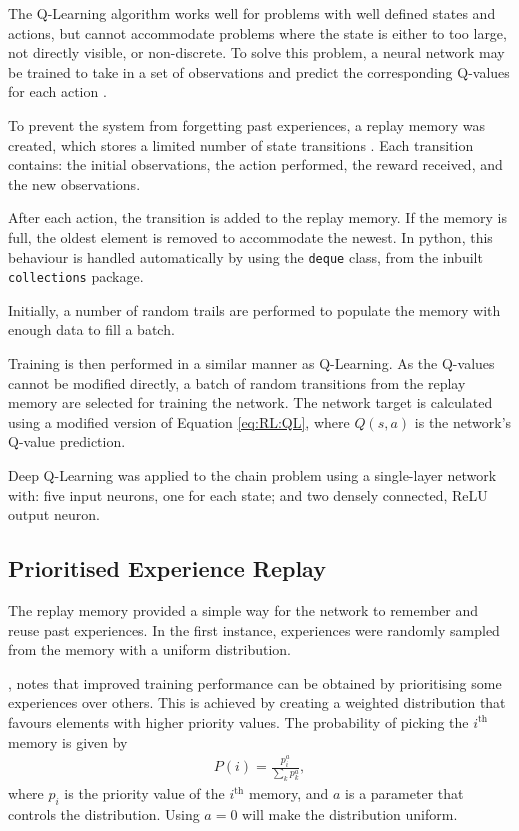 The Q-Learning algorithm works well for problems with well defined states and
actions, but cannot accommodate problems where the state is either to too large,
not directly visible, or non-discrete.
To solve this problem, a neural network may be trained to take in a set of
observations and predict the corresponding Q-values for each action
\citep{Lin:1990:Self}.

To prevent the system from forgetting past experiences, a replay memory was
created, which stores a limited number of state transitions
\citep{Lin:1992:Self}.
Each transition contains: the initial observations, the action performed,
the reward received, and the new observations.

After each action, the transition is added to the replay memory.
If the memory is full, the oldest element is removed to accommodate the newest.
In python, this behaviour is handled automatically by using the \texttt{deque}
class, from the inbuilt \texttt{collections} package.

Initially, a number of random trails are performed to populate the memory with
enough data to fill a batch.

Training is then performed in a similar manner as Q-Learning.
As the Q-values cannot be modified directly, a batch of random transitions from
the replay memory are selected for training the network.
The network target is calculated using a modified version of Equation
\ref{eq:RL:QL}, where $Q(s,a)$ is the network's Q-value prediction.

Deep Q-Learning was applied to the chain problem using a single-layer network
with: five input neurons, one for each state; and two densely connected, ReLU
output neuron.



\subsection{Prioritised Experience Replay}

The replay memory provided a simple way for the network to remember and reuse
past experiences.
In the first instance, experiences were randomly sampled from the memory with a
uniform distribution.

\cite{Schaul:2015:Prioritized}, notes that improved training performance can be
obtained by prioritising some experiences over others.
This is achieved by creating a weighted distribution that favours elements with
higher priority values.
The probability of picking the $i^\text{th}$ memory is given by
\begin{align*}
    P(i) = \frac{p_i^a}{\sum_{k} p_k^a},
\end{align*}
where $p_i$ is the priority value of the $i^\text{th}$ memory, and $a$ is a
parameter that controls the distribution.
Using $a = 0$ will make the distribution uniform.

